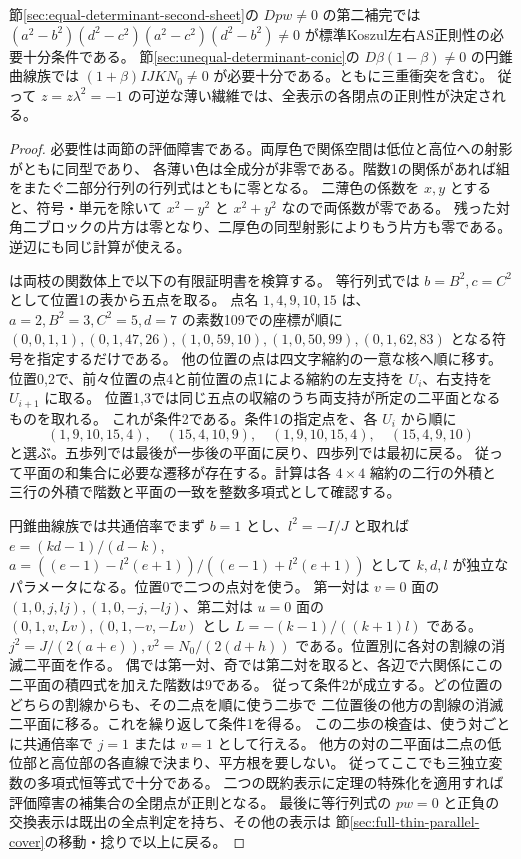 \begin{corollary}\label{cor:rank-ten-sheets-complete-regularity}
節\ref{sec:equal-determinant-second-sheet}の $Dpw\ne0$ の第二補完では
$(a^2-b^2)(d^2-c^2)(a^2-c^2)(d^2-b^2)\ne0$ が標準Koszul左右AS正則性の必要十分条件である。
節\ref{sec:unequal-determinant-conic}の $D\beta(1-\beta)\ne0$ の円錐曲線族では
$(1+\beta)I J K N_0\ne0$ が必要十分である。ともに三重衝突を含む。
従って $z=z\lambda^2=-1$ の可逆な薄い繊維では、全表示の各閉点の正則性が決定される。
\end{corollary}
\begin{proof}
必要性は両節の評価障害である。両厚色で関係空間は低位と高位への射影がともに同型であり、
各薄い色は全成分が非零である。階数1の関係があれば組をまたぐ二部分行列の行列式はともに零となる。
二薄色の係数を $x,y$ とすると、符号・単元を除いて $x^2-y^2$ と $x^2+y^2$ なので両係数が零である。
残った対角二ブロックの片方は零となり、二厚色の同型射影によりもう片方も零である。
逆辺にも同じ計算が使える。

は両枝の関数体上で以下の有限証明書を検算する。
等行列式では $b=B^2,c=C^2$ として位置1の表から五点を取る。
点名 $1,4,9,10,15$ は、$a=2,B^2=3,C^2=5,d=7$ の素数109での座標が順に
$(0,0,1,1),(0,1,47,26),(1,0,59,10),(1,0,50,99),(0,1,62,83)$ となる符号を指定するだけである。
他の位置の点は四文字縮約の一意な核へ順に移す。
位置0,2で、前々位置の点4と前位置の点1による縮約の左支持を $U_i$、右支持を $U_{i+1}$ に取る。
位置1,3では同じ五点の収縮のうち両支持が所定の二平面となるものを取れる。
これが条件2である。条件1の指定点を、各 $U_i$ から順に
\[
 (1,9,10,15,4),\quad(15,4,10,9),\quad(1,9,10,15,4),\quad(15,4,9,10)
\]
と選ぶ。五歩列では最後が一歩後の平面に戻り、四歩列では最初に戻る。
従って平面の和集合に必要な遷移が存在する。計算は各 $4\times4$ 縮約の二行の外積と
三行の外積で階数と平面の一致を整数多項式として確認する。

円錐曲線族では共通倍率でまず $b=1$ とし、$l^2=-I/J$ と取れば
$e=(kd-1)/(d-k)$, $a=((e-1)-l^2(e+1))/((e-1)+l^2(e+1))$ として
$k,d,l$ が独立なパラメータになる。位置0で二つの点対を使う。
第一対は $v=0$ 面の $(1,0,j,lj),(1,0,-j,-lj)$、第二対は $u=0$ 面の
$(0,1,v,Lv),(0,1,-v,-Lv)$ とし $L=-(k-1)/((k+1)l)$ である。
$j^2=J/(2(a+e)),v^2=N_0/(2(d+h))$ である。位置別に各対の割線の消滅二平面を作る。
偶では第一対、奇では第二対を取ると、各辺で六関係にこの二平面の積四式を加えた階数は9である。
従って条件2が成立する。どの位置のどちらの割線からも、その二点を順に使う二歩で
二位置後の他方の割線の消滅二平面に移る。これを繰り返して条件1を得る。
この二歩の検査は、使う対ごとに共通倍率で $j=1$ または $v=1$ として行える。
他方の対の二平面は二点の低位部と高位部の各直線で決まり、平方根を要しない。
従ってここでも三独立変数の多項式恒等式で十分である。
二つの既約表示に定理の特殊化を適用すれば評価障害の補集合の全閉点が正則となる。
最後に等行列式の $p w=0$ と正負の交換表示は既出の全点判定を持ち、その他の表示は
節\ref{sec:full-thin-parallel-cover}の移動・捻りで以上に戻る。
\end{proof}
